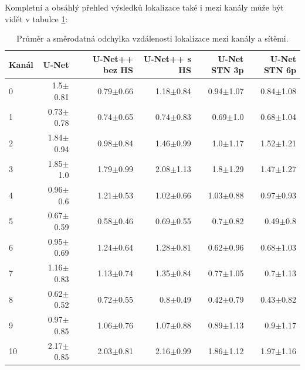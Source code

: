 Kompletní a obsáhlý přehled výsledků lokalizace také i mezi kanály může být vidět v tabulce \ref{tab:mean_std_channels}:

\begin{table}[ht]
    \centering
    \begin{tabular}{lrrrrr}
    \toprule
    Kanál & U-Net & U-Net++ bez HS & U-Net++ s HS & U-Net STN 3p & U-Net STN 6p \\
    \midrule
    0 & 1.5$\pm$0.81 & 0.79$\pm$0.66 & 1.18$\pm$0.84 & 0.94$\pm$1.07 & 0.84$\pm$1.08 \\
    1 & 0.73$\pm$0.78 & 0.74$\pm$0.65 & 0.74$\pm$0.83 & 0.69$\pm$1.0 & 0.68$\pm$1.04 \\
    2 & 1.84$\pm$0.94 & 0.98$\pm$0.84 & 1.46$\pm$0.99 & 1.0$\pm$1.17 & 1.52$\pm$1.21 \\
    3 & 1.85$\pm$1.0 & 1.79$\pm$0.99 & 2.08$\pm$1.13 & 1.8$\pm$1.29 & 1.47$\pm$1.27 \\
    4 & 0.96$\pm$0.6 & 1.21$\pm$0.53 & 1.02$\pm$0.66 & 1.03$\pm$0.88 & 0.97$\pm$0.93 \\
    5 & 0.67$\pm$0.59 & 0.58$\pm$0.46 & 0.69$\pm$0.55 & 0.7$\pm$0.82 & 0.49$\pm$0.8 \\
    6 & 0.95$\pm$0.69 & 1.24$\pm$0.64 & 1.28$\pm$0.81 & 0.62$\pm$0.96 & 0.68$\pm$1.03 \\
    7 & 1.16$\pm$0.83 & 1.13$\pm$0.74 & 1.35$\pm$0.84 & 0.77$\pm$1.05 & 0.7$\pm$1.13 \\
    8 & 0.62$\pm$0.52 & 0.72$\pm$0.55 & 0.8$\pm$0.49 & 0.42$\pm$0.79 & 0.43$\pm$0.82 \\
    9 & 0.97$\pm$0.85 & 1.06$\pm$0.76 & 1.07$\pm$0.88 & 0.89$\pm$1.13 & 0.9$\pm$1.17 \\
    10 & 2.17$\pm$0.85 & 2.03$\pm$0.81 & 2.16$\pm$0.99 & 1.86$\pm$1.12 & 1.97$\pm$1.16 \\
    \bottomrule
    \end{tabular}
    \caption[Průměr a směrodatná odchylka vzdálenosti mezi kanály a sítěmi]{Průměr a směrodatná odchylka vzdálenosti lokalizace mezi kanály a sítěmi.}
    \label{tab:mean_std_channels}
\end{table}


\endinput
